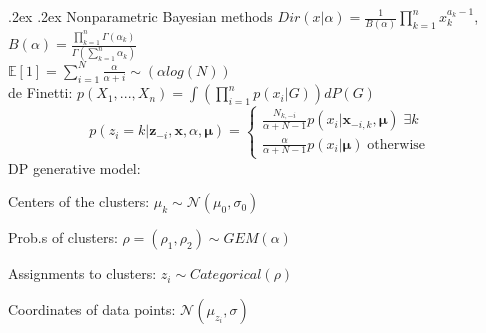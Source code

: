 \documentclass[11pt,landscape,a4paper,fleqn]{article}
\makeatletter
\renewcommand{\section}{\@startsection{section}{1}{0mm}%
                                {.2ex}%
                                {.2ex}%
	                                {\color{myred}\sffamily\small\bfseries}}
\renewcommand{\subsection}{\@startsection{subsection}{1}{0mm}%
                                {.2ex}%
                                {.2ex}%
                                {\color{myorange}\sffamily\bfseries}}
\makeatother
\begin{document}
\begin{multicols*}{4}
\section{Nonparametric Bayesian methods}
$Dir(x|\alpha) = \frac{1}{B(\alpha)} \prod_{k=1}^n x_k^{a_k - 1}$, $B(\alpha) = \frac{\prod_{k=1}^n \Gamma(\alpha_k)}{\Gamma(\sum_{k=1}^n \alpha_k)}$ \\
$\mathbb{E}[1] = \sum_{i=1}^N \frac{\alpha}{\alpha + i} \sim(\alpha log(N))$ \\
de Finetti: $p(X_1, ..., X_n) {=} \int (\prod_{i=1}^n p(x_i|G))dP(G)$ \\
\[ p(z_i=k|\bm{z}_{-i},\bm{x},\alpha,\bm{\mu}) = \begin{cases}
      \frac{N_{k,-i}}{\alpha + N - 1} p(x_i|\bm{x}_{-i,k},\bm{\mu}) \;\exists k \\
      \frac{\alpha}{\alpha + N - 1} p(x_i|\bm{\mu}) \;\text{otherwise}
   \end{cases}
\]
DP generative model: \\
\begin{inparaitem}[\color{red}\textbullet]
\item Centers of the clusters: $\mu_k \sim \mathcal{N}(\mu_0, \sigma_0)$ \\
\item Prob.s of clusters: $\rho = (\rho_1, \rho_2) \sim  GEM(\alpha)$ \\
\item Assignments to clusters: $z_i \sim Categorical(\rho)$ \\
\item Coordinates of data points: $\mathcal{N}(\mu_{z_i}, \sigma)$
\end{inparaitem}




\end{multicols*}
\end{document}
